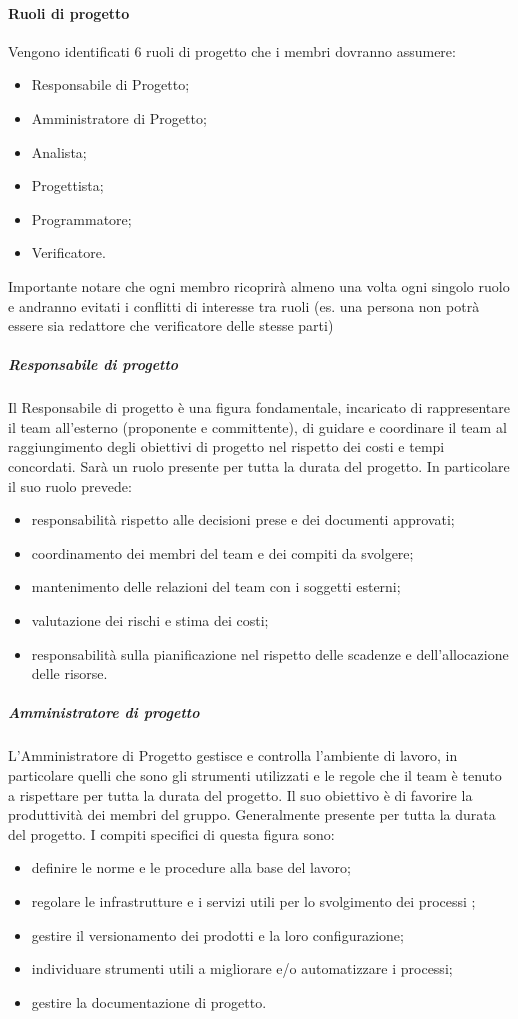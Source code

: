 \paragraph{Ruoli di progetto}
Vengono identificati 6 ruoli di progetto che i membri dovranno assumere:

\begin{itemize}
\item Responsabile di Progetto;
\item Amministratore di Progetto;
\item Analista;
\item Progettista;
\item Programmatore;
\item Verificatore.
\end{itemize}

Importante notare che ogni membro ricoprirà almeno una volta ogni singolo ruolo e andranno evitati i conflitti di interesse tra ruoli (es. una persona non potrà essere sia redattore che verificatore delle stesse parti)

\subparagraph{Responsabile di progetto}
Il Responsabile di progetto è una figura fondamentale, incaricato di rappresentare il team all'esterno (proponente e committente), di guidare e coordinare il team al raggiungimento degli obiettivi di progetto nel rispetto dei costi e tempi concordati. Sarà un ruolo presente per tutta la durata del progetto.
In particolare il suo ruolo prevede:
\begin{itemize}
\item responsabilità rispetto alle decisioni prese e dei documenti approvati;
\item coordinamento dei membri del team e dei compiti da svolgere;
\item mantenimento delle relazioni del team con i soggetti esterni;
\item valutazione dei rischi e stima dei costi;
\item responsabilità sulla pianificazione nel rispetto delle scadenze e dell'allocazione delle risorse.
\end{itemize}


\subparagraph{Amministratore di progetto}
L'Amministratore di Progetto gestisce e controlla l'ambiente di lavoro, in particolare quelli che sono gli strumenti utilizzati e le regole che il team è tenuto a rispettare per tutta la durata del progetto. Il suo obiettivo è di favorire la produttività dei membri del gruppo. Generalmente presente per tutta la durata del progetto.
I compiti specifici di questa figura sono:
\begin{itemize}
\item definire le norme e le procedure alla base del lavoro;
\item regolare le infrastrutture e i servizi utili per lo svolgimento dei processi ;
\item gestire il versionamento dei prodotti e la loro configurazione;
\item individuare strumenti utili a migliorare e/o automatizzare i processi;
\item gestire la documentazione di progetto.
\end{itemize}

